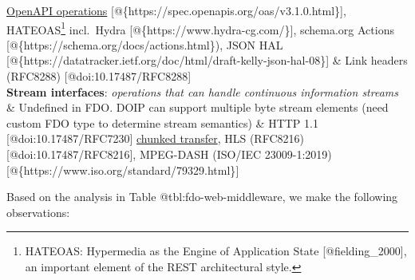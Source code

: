 \begin{longtable}[]
\href{https://spec.openapis.org/oas/v3.1.0.html\#operation-object}{OpenAPI
operations} {[}@\{https://spec.openapis.org/oas/v3.1.0.html\}{]},
HATEOAS\footnote{HATEOAS: Hypermedia as the Engine of Application State
  {[}@fielding\_2000{]}, an important element of the REST architectural
  style.} incl.~Hydra {[}@\{https://www.hydra-cg.com/\}{]}, schema.org
Actions {[}@\{https://schema.org/docs/actions.html\}), JSON HAL
{[}@\{https://datatracker.ietf.org/doc/html/draft-kelly-json-hal-08\}{]}
\& Link headers (RFC8288) {[}@doi:10.17487/RFC8288{]} \\
\textbf{Stream interfaces}: \emph{operations that can handle continuous
information streams} & Undefined in FDO. DOIP can support multiple byte
stream elements (need custom FDO type to determine stream semantics) &
HTTP 1.1 {[}@doi:10.17487/RFC7230{]}
\href{https://datatracker.ietf.org/doc/html/rfc7230\#section-4.1}{chunked
transfer}, HLS (RFC8216) {[}@doi:10.17487/RFC8216{]}, MPEG-DASH (ISO/IEC
23009-1:2019) {[}@\{https://www.iso.org/standard/79329.html\}{]} \\
\bottomrule
\end{longtable}

Based on the analysis in Table @tbl:fdo-web-middleware, we make the
following observations:

